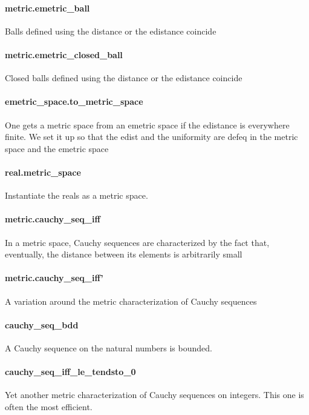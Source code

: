 \documentclass{article}
\begin{document}
\paragraph{metric.emetric\_ball}
\par
Balls defined using the distance or the edistance coincide
\paragraph{metric.emetric\_closed\_ball}
\par
Closed balls defined using the distance or the edistance coincide
\paragraph{emetric\_space.to\_metric\_space}
\par
One gets a metric space from an emetric space if the edistance
is everywhere finite. We set it up so that the edist and the uniformity are
defeq in the metric space and the emetric space
\paragraph{real.metric\_space}
\par
Instantiate the reals as a metric space.
\paragraph{metric.cauchy\_seq\_iff}
\par
In a metric space, Cauchy sequences are characterized by the fact that, eventually,
the distance between its elements is arbitrarily small
\paragraph{metric.cauchy\_seq\_iff'}
\par
A variation around the metric characterization of Cauchy sequences
\paragraph{cauchy\_seq\_bdd}
\par
A Cauchy sequence on the natural numbers is bounded.
\paragraph{cauchy\_seq\_iff\_le\_tendsto\_0}
\par
Yet another metric characterization of Cauchy sequences on integers. This one is often the
most efficient.
\end{document}
